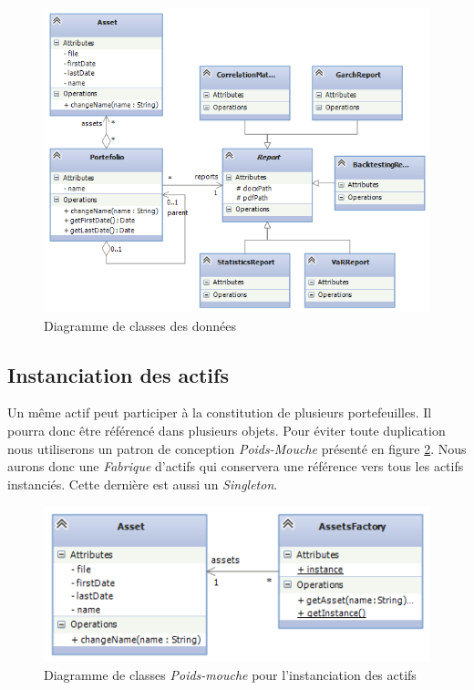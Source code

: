 \documentclass[a4paper,titlepage,french]{report}
\begin{document}
\begin{figure}
  	\center
  	\includegraphics[width=1\textwidth]{diagramme-classes-donnees.png}
  	\caption{Diagramme de classes des données}
  	\label{fig:diagramme-classes-donnees}
\end{figure}


\subsection{Instanciation des actifs}

Un même actif peut participer à la constitution de plusieurs portefeuilles.
Il pourra donc être référencé dans plusieurs objets.
Pour éviter toute duplication nous utiliserons un patron de conception \textit{Poids-Mouche} présenté en figure \ref{fig:diagramme-classes-flyweight}.
Nous aurons donc une \textit{Fabrique} d'actifs qui conservera une référence vers tous les actifs instanciés. Cette dernière est aussi un \textit{Singleton}.

\begin{figure}
  	\center
  	\includegraphics[width=1\textwidth]{diagramme-classes-flyweight.png}
  	\caption{Diagramme de classes \textit{Poids-mouche} pour l'instanciation des actifs}
  	\label{fig:diagramme-classes-flyweight}
\end{figure}
\end{document}
